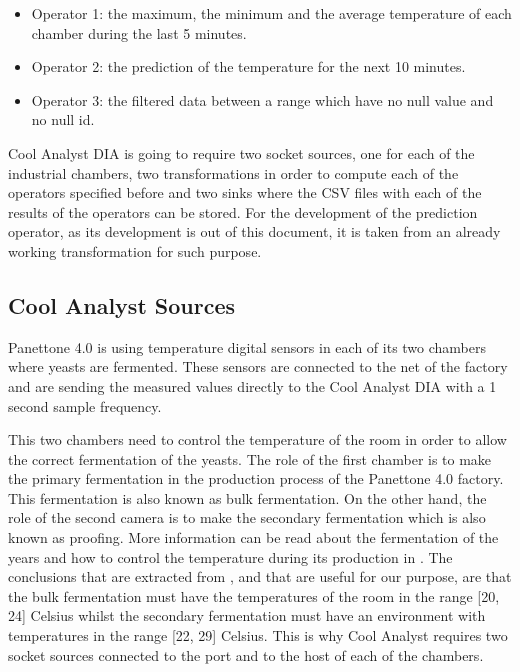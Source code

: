 \begin{itemize}
\item Operator 1: the maximum, the minimum and the average temperature of each chamber during the last 5 minutes.
\item Operator 2: the prediction of the temperature for the next 10 minutes.
\item Operator 3: the filtered data between a range which have no null value and no null id.
\end{itemize}

Cool Analyst DIA is going to require two socket sources, one for each of the industrial chambers, two transformations in order to compute each of the operators specified before and two sinks where the CSV files with each of the results of the operators can be stored. For the development of the prediction operator, as its development is out of this document, it is taken from an already working transformation for such purpose.

\subsection{Cool Analyst Sources}

Panettone 4.0 is using temperature digital sensors in each of its two chambers where yeasts are fermented. These sensors are connected to the net of the factory and are sending the measured values directly to the Cool Analyst DIA with a 1 second sample frequency.

This two chambers need to control the temperature of the room in order to allow the correct fermentation of the yeasts. The role of the first chamber is to make the primary fermentation in the production process of the Panettone 4.0 factory. This fermentation is also known as bulk fermentation. On the other hand, the role of the second camera is to make the secondary fermentation which is also known as proofing. More information can be read about the fermentation of the years and how to control the temperature during its production in \cite{yeastfermentation}. The conclusions that are extracted from \cite{yeastfermentation}, and that are useful for our purpose, are that the bulk fermentation must have the temperatures of the room in the range [20, 24] Celsius whilst the secondary fermentation must have an environment with temperatures in the range [22, 29] Celsius. This is why Cool Analyst requires two socket sources connected to the port and to the host of each of the chambers.

